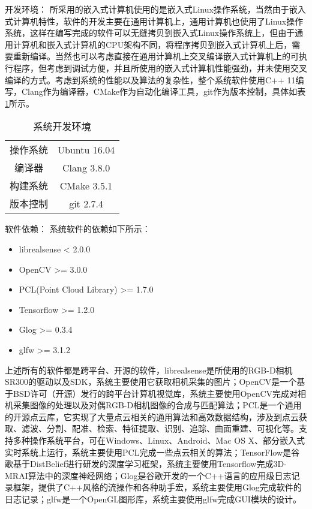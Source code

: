 {\kai 开发环境：}
所采用的嵌入式计算机使用的是嵌入式Linux操作系统，当然由于嵌入式计算机特性，软件的开发主要在通用计算机上，通用计算机也使用了Linux操作系统，这样在编写完成的软件可以无缝拷贝到嵌入式Linux操作系统上，但由于通用计算机和嵌入式计算机的CPU架构不同，将程序拷贝到嵌入式计算机上后，需要重新编译。当然也可以考虑直接在通用计算机上交叉编译嵌入式计算机上的可执行程序，但考虑到调试方便，并且所使用的嵌入式计算机性能强劲，并未使用交叉编译的方式。考虑到系统的性能以及算法的复杂性，整个系统软件使用C++ 11编写，Clang作为编译器，CMake作为自动化编译工具，git作为版本控制，具体如表\ref{tab:dev_env}所示。
\begin{table}[ht]
  \centering
  \begin{tabular}{cc}
    \toprule
    操作系统&Ubuntu 16.04\\
    编译器&Clang 3.8.0 \\
    构建系统&CMake 3.5.1 \\
    版本控制& git 2.7.4 \\
    \bottomrule
  \end{tabular}
  \caption{系统开发环境}
  \label{tab:dev_env}
\end{table}

{\kai 软件依赖：}
系统软件的依赖如下所示：
\begin{itemize}
\item librealsense < 2.0.0
\item OpenCV >= 3.0.0
\item PCL(Point Cloud Library) >= 1.7.0
\item Tensorflow >= 1.2.0
\item Glog >= 0.3.4
\item glfw >= 3.1.2
\end{itemize}
上述所有的软件都是跨平台、开源的软件，librealsense是所使用的RGB-D相机SR300的驱动以及SDK，系统主要使用它获取相机采集的图片；OpenCV是一个基于BSD许可（开源）发行的跨平台计算机视觉库，系统主要使用OpenCV完成对相机采集图像的处理以及对偶RGB-D相机图像的合成与匹配算法；PCL是一个通用的开源点云库，它实现了大量点云相关的通用算法和高效数据结构，涉及到点云获取、滤波、分割、配准、检索、特征提取、识别、追踪、曲面重建、可视化等。支持多种操作系统平台，可在Windows、Linux、Android、Mac OS X、部分嵌入式实时系统上运行，系统主要使用PCL完成一些点云相关的算法；TensorFlow是谷歌基于DistBelief进行研发的深度学习框架，系统主要使用Tensorflow完成3D-MRAI算法中的深度神经网络；Glog是谷歌开发的一个C++语言的应用级日志记录框架，提供了C++风格的流操作和各种助手宏，系统主要使用Glog完成软件的日志记录；glfw是一个OpenGL图形库，系统主要使用glfw完成GUI模块的设计。

